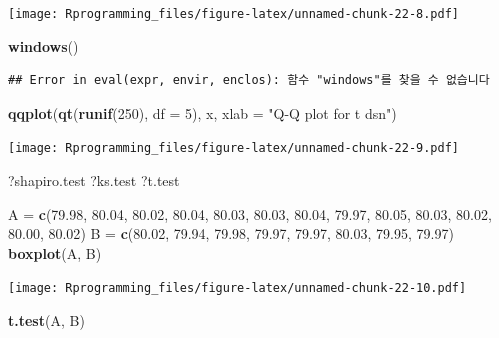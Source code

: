 \documentclass[11pt,]{krantz}
\makeatletter
\newenvironment{Shaded}{\begin{snugshade}}{\end{snugshade}}
\newcommand{\KeywordTok}[1]{\textcolor[rgb]{0.13,0.29,0.53}{\textbf{#1}}}
\newcommand{\DataTypeTok}[1]{\textcolor[rgb]{0.13,0.29,0.53}{#1}}
\newcommand{\DecValTok}[1]{\textcolor[rgb]{0.00,0.00,0.81}{#1}}
\newcommand{\FloatTok}[1]{\textcolor[rgb]{0.00,0.00,0.81}{#1}}
\newcommand{\StringTok}[1]{\textcolor[rgb]{0.31,0.60,0.02}{#1}}
\newcommand{\NormalTok}[1]{#1}
\newenvironment{kframe}{%
\medskip{}
\setlength{\fboxsep}{.8em}
 \def\at@end@of@kframe{}%
 \ifinner\ifhmode%
  \def\at@end@of@kframe{\end{minipage}}%
  \begin{minipage}{\columnwidth}%
 \fi\fi%
 \def\FrameCommand##1{\hskip\@totalleftmargin \hskip-\fboxsep
 \colorbox{shadecolor}{##1}\hskip-\fboxsep
     \hskip-\linewidth \hskip-\@totalleftmargin \hskip\columnwidth}%
 \MakeFramed {\advance\hsize-\width
   \@totalleftmargin\z@ \linewidth\hsize
   \@setminipage}}%
 {\par\unskip\endMakeFramed%
 \at@end@of@kframe}
\renewenvironment{Shaded}{\begin{kframe}}{\end{kframe}}
\theoremstyle{definition}
\theoremstyle{definition}
\theoremstyle{remark}
\makeatother
\begin{document}
\texttt{[image: Rprogramming\_files/figure-latex/unnamed-chunk-22-8.pdf]}

\begin{Shaded}
\begin{Highlighting}[]
\KeywordTok{windows}\NormalTok{()}
\end{Highlighting}
\end{Shaded}

\begin{verbatim}
## Error in eval(expr, envir, enclos): 함수 "windows"를 찾을 수 없습니다
\end{verbatim}

\begin{Shaded}
\begin{Highlighting}[]
\KeywordTok{qqplot}\NormalTok{(}\KeywordTok{qt}\NormalTok{(}\KeywordTok{runif}\NormalTok{(}\DecValTok{250}\NormalTok{), }\DataTypeTok{df =} \DecValTok{5}\NormalTok{), x, }\DataTypeTok{xlab =} \StringTok{"Q-Q plot for t dsn"}\NormalTok{)}
\end{Highlighting}
\end{Shaded}

\texttt{[image: Rprogramming\_files/figure-latex/unnamed-chunk-22-9.pdf]}

\begin{Shaded}
\begin{Highlighting}[]
\NormalTok{?shapiro.test}
\NormalTok{?ks.test}
\NormalTok{?t.test}


\NormalTok{A =}\StringTok{ }\KeywordTok{c}\NormalTok{(}\FloatTok{79.98}\NormalTok{, }\FloatTok{80.04}\NormalTok{, }\FloatTok{80.02}\NormalTok{, }\FloatTok{80.04}\NormalTok{, }\FloatTok{80.03}\NormalTok{, }\FloatTok{80.03}\NormalTok{, }\FloatTok{80.04}\NormalTok{, }\FloatTok{79.97}\NormalTok{, }\FloatTok{80.05}\NormalTok{, }\FloatTok{80.03}\NormalTok{, }\FloatTok{80.02}\NormalTok{, }\FloatTok{80.00}\NormalTok{, }\FloatTok{80.02}\NormalTok{)}
\NormalTok{B =}\StringTok{ }\KeywordTok{c}\NormalTok{(}\FloatTok{80.02}\NormalTok{, }\FloatTok{79.94}\NormalTok{, }\FloatTok{79.98}\NormalTok{, }\FloatTok{79.97}\NormalTok{, }\FloatTok{79.97}\NormalTok{, }\FloatTok{80.03}\NormalTok{, }\FloatTok{79.95}\NormalTok{, }\FloatTok{79.97}\NormalTok{)}
\KeywordTok{boxplot}\NormalTok{(A, B)}
\end{Highlighting}
\end{Shaded}

\texttt{[image: Rprogramming\_files/figure-latex/unnamed-chunk-22-10.pdf]}

\begin{Shaded}
\begin{Highlighting}[]
\KeywordTok{t.test}\NormalTok{(A, B)}
\end{Highlighting}
\end{Shaded}
\end{document}
